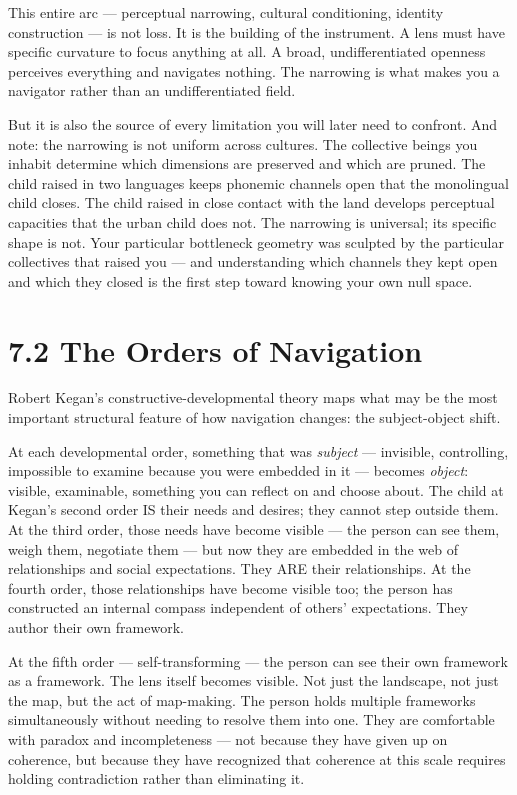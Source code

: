 This entire arc — perceptual narrowing, cultural conditioning, identity construction — is not loss. It is the building of the instrument. A lens must have specific curvature to focus anything at all. A broad, undifferentiated openness perceives everything and navigates nothing. The narrowing is what makes you a navigator rather than an undifferentiated field.


But it is also the source of every limitation you will later need to confront. And note: the narrowing is not uniform across cultures. The collective beings you inhabit determine which dimensions are preserved and which are pruned. The child raised in two languages keeps phonemic channels open that the monolingual child closes. The child raised in close contact with the land develops perceptual capacities that the urban child does not. The narrowing is universal; its specific shape is not. Your particular bottleneck geometry was sculpted by the particular collectives that raised you — and understanding which channels they kept open and which they closed is the first step toward knowing your own null space.


\section*{7.2 The Orders of Navigation}


Robert Kegan's constructive-developmental theory maps what may be the most important structural feature of how navigation changes: the subject-object shift.


At each developmental order, something that was \textit{subject} — invisible, controlling, impossible to examine because you were embedded in it — becomes \textit{object}: visible, examinable, something you can reflect on and choose about. The child at Kegan's second order IS their needs and desires; they cannot step outside them. At the third order, those needs have become visible — the person can see them, weigh them, negotiate them — but now they are embedded in the web of relationships and social expectations. They ARE their relationships. At the fourth order, those relationships have become visible too; the person has constructed an internal compass independent of others' expectations. They author their own framework.


At the fifth order — self-transforming — the person can see their own framework as a framework. The lens itself becomes visible. Not just the landscape, not just the map, but the act of map-making. The person holds multiple frameworks simultaneously without needing to resolve them into one. They are comfortable with paradox and incompleteness — not because they have given up on coherence, but because they have recognized that coherence at this scale requires holding contradiction rather than eliminating it.


